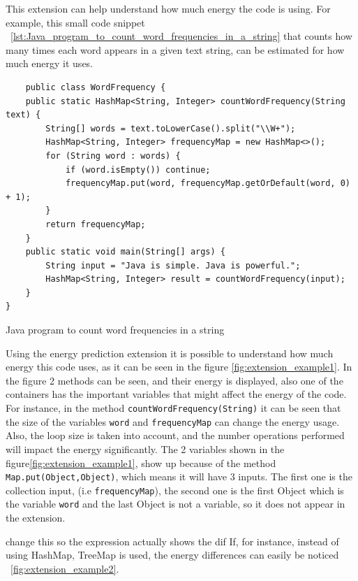 This extension can help understand how much energy the code is using.
For example, this small code snippet ~\ref{lst:Java_program_to_count_word_frequencies_in_a_string} that counts how many times each word appears in a given text string, can be estimated for how much energy it uses.

\begin{listing}[H]
\begin{verbatim}
    public class WordFrequency {
    public static HashMap<String, Integer> countWordFrequency(String text) {
        String[] words = text.toLowerCase().split("\\W+");
        HashMap<String, Integer> frequencyMap = new HashMap<>();
        for (String word : words) {
            if (word.isEmpty()) continue; 
            frequencyMap.put(word, frequencyMap.getOrDefault(word, 0) + 1);
        }
        return frequencyMap;
    }
    public static void main(String[] args) {
        String input = "Java is simple. Java is powerful.";
        HashMap<String, Integer> result = countWordFrequency(input);
    }
}
\end{verbatim}
\caption{Java program to count word frequencies in a string}            
\label{lst:Java_program_to_count_word_frequencies_in_a_string}
\end{listing}

Using the energy prediction extension it is possible to understand how much energy this code uses, as it can be seen in the figure \ref{fig:extension_example1}.
In the figure 2 methods can be seen, and their energy is displayed, also one of the containers has the important variables that might affect the energy of the code. For instance, in the method \texttt{countWordFrequency(String)} it can be seen that the size of the variables \texttt{word} and \texttt{frequencyMap} can change the energy usage. Also, the loop size is taken into account, and the number operations performed will impact the energy significantly.
The 2 variables shown in the figure\ref{fig:extension_example1}, show up because of the method \texttt{Map.put(Object,Object)}, which means it will have 3 inputs. The first one is the collection input, (i.e \texttt{frequencyMap}), the second one is the first Object which is the variable \texttt{word} and the last Object is not a variable, so it does not appear in the extension.


\color{blue} {change this so the expression actually shows the dif}
If, for instance, instead of using HashMap, TreeMap is used, the energy differences can easily be noticed ~\ref{fig:extension_example2}.



